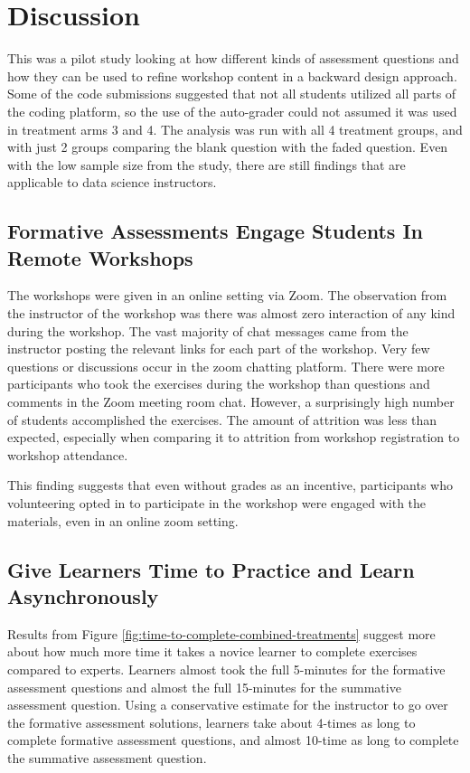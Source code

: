 \documentclass[acmsmall]{acmart}
\begin{document}
\section{Discussion}


This was a pilot study looking at how different kinds of assessment questions
and how they can be used to refine workshop content in a backward design approach.
Some of the code submissions suggested that not all students utilized all parts of the
coding platform,
so the use of the auto-grader could not assumed it was used in treatment arms 3 and 4.
The analysis was run with all 4 treatment groups, and with just 2 groups comparing
the blank question with the faded question.
Even with the low sample size from the study,
there are still findings that are applicable to data science instructors.

\subsection{Formative Assessments Engage Students In Remote Workshops}

The workshops were given in an online setting via Zoom.
The observation from the instructor of the workshop was there was almost zero
interaction of any kind during the workshop.
The vast majority of chat messages came from the instructor posting the
relevant links for each part of the workshop.
Very few questions or discussions occur in the zoom chatting platform.
There were more participants who took the exercises during the workshop than
questions and comments in the Zoom meeting room chat.
However, a surprisingly high number of students accomplished the exercises.
The amount of attrition was less than expected,
especially when comparing it to attrition from workshop registration to workshop attendance.

This finding suggests that even without grades as an incentive,
participants who volunteering opted in to participate in the workshop
were engaged with the materials, even in an online zoom setting.

\subsection{Give Learners Time to Practice and Learn Asynchronously}

Results from Figure \ref{fig:time-to-complete-combined-treatments} suggest more about
how much more time it takes a novice learner to complete exercises compared to experts.
Learners almost took the full 5-minutes for the formative assessment questions and
almost the full 15-minutes for the summative assessment question.
Using a conservative estimate for the instructor to go over the formative assessment solutions,
learners take about 4-times as long to complete formative assessment questions,
and almost 10-time as long to complete the summative assessment question.
\end{document}
